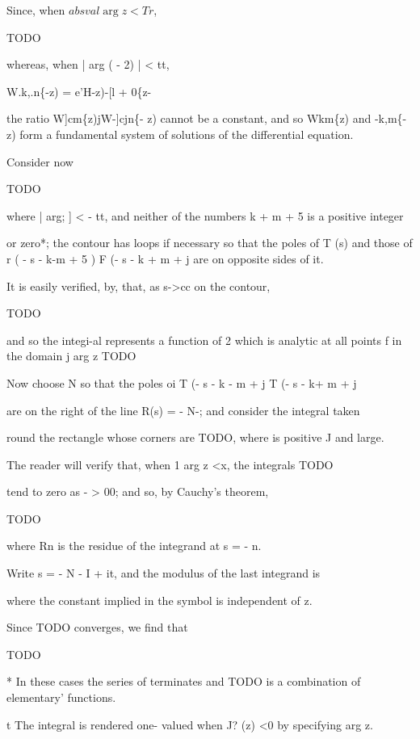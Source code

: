 Since, when $absval{\arg z} < Tr$,

TODO

whereas, when | arg ( - 2) | < tt,

W.k,.n\{-z) = e'H-z)-[l + 0\{z-%

the ratio W]cm\{z)jW-]cjn\{- z) cannot be a constant, and so
Wkm\{z) and -k,m\{- z) form a fundamental system of solutions of
the differential equation.


Consider now

TODO

where | arg; ] < - tt, and neither of the numbers k + m + 5 is a
positive integer

%
%

or zero*; the contour has loops if necessary so that the poles of T
(s) and those of r ( - s - k-m + 5 ) F (- s - k + m + j are on
opposite sides of it.

It is easily verified, by, that, as s->cc on the contour,

TODO

and so the integi-al represents a function of 2 which is analytic at
all points f in the domain j arg z TODO

Now choose N so that the poles oi T (- s - k - m + j T (- s - k+ m +
j

are on the right of the line R(s) = - N-; and consider the integral
taken

round the rectangle whose corners are TODO, where  is
positive J and large.

The reader will verify that, when 1 arg z <x, the integrals TODO

tend to zero as - > 00; and so, by Cauchy's theorem,

TODO

where Rn is the residue of the integrand at s = - n.

Write s = - N - I + it, and the modulus of the last integrand is

where the constant implied in the symbol is independent of z.

Since TODO converges, we find that

TODO

* In these cases the series of terminates and TODO is a
combination of elementary' functions.

t The integral is rendered one- valued when J? (z) <0 by specifying
arg z.

